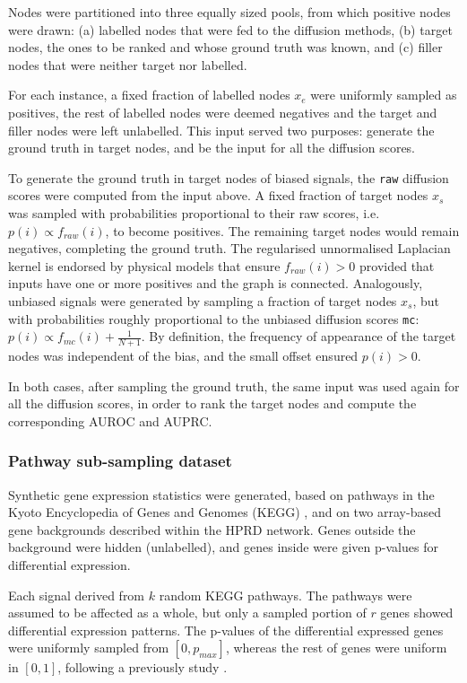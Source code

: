 \documentclass[final]{bioinfo}
\newcommand{\method}{\texttt}
\begin{document}
\begin{methods}
Nodes were partitioned into three equally sized pools, from which positive nodes were drawn: (a) labelled nodes that were fed to the diffusion methods, (b) target nodes, the ones to be ranked and whose ground truth was known, and (c) filler nodes that were neither target nor labelled. 

For each instance, a fixed fraction of labelled nodes $x_e$ were uniformly sampled as positives, the rest of labelled nodes were deemed negatives and the target and filler nodes were left unlabelled.
This input served two purposes: generate the ground truth in target nodes, and be the input for all the diffusion scores.

To generate the ground truth in target nodes of biased signals, the \method{raw} diffusion scores were computed from the input above. 
A fixed fraction of target nodes $x_s$ was sampled with probabilities proportional to their raw scores, i.e. $p(i) \propto f_{raw}(i)$, to become positives. 
The remaining target nodes would remain negatives, completing the ground truth. 
The regularised unnormalised Laplacian kernel is endorsed by physical models that ensure $f_{raw}(i) > 0$ provided that inputs have one or more positives and the graph is connected.
Analogously, unbiased signals were generated by sampling a fraction of target nodes $x_s$, but with probabilities roughly proportional to the unbiased diffusion scores \method{mc}: $ p(i) \propto f_{mc}(i) + \frac{1}{N + 1}$. 
By definition, the frequency of appearance of the target nodes was independent of the bias, and the small offset ensured $ p(i) > 0 $.

In both cases, after sampling the ground truth, the same input was used again for all the diffusion scores, in order to rank the target nodes and compute the corresponding AUROC and AUPRC.

\subsubsection*{Pathway sub-sampling dataset}

Synthetic gene expression statistics were generated, based on pathways in the Kyoto Encyclopedia of Genes and Genomes (KEGG) \citep{kegg2017}, and on two array-based gene backgrounds described within the HPRD network. 
Genes outside the background were hidden (unlabelled), and genes inside were given p-values for differential expression.  

Each signal derived from $k$ random KEGG pathways. 
The pathways were assumed to be affected as a whole, but only a sampled portion of $r$ genes showed differential expression patterns. 
The p-values of the differential expressed genes were uniformly sampled from $[0, p_{max}]$, whereas the rest of genes were uniform in $[0,1]$, following a previously study \citep{pathway_simulation_pvals}.


\end{methods}
\end{document}
